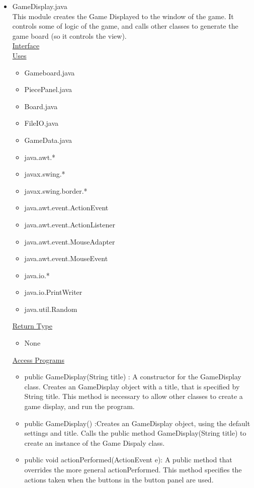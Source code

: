 \documentclass[12pt]{article}
\begin{document}
\begin{itemize}
		\item GameDisplay.java \\
		This module creates the Game Displayed to the window of the game. It controls some of logic of the game, and calls other classes to generate the game board (so it controls the view). \\
		\underline{Interface} \\
		\underline{Uses}
		\begin{itemize}
			\item Gameboard.java
			\item PiecePanel.java
			\item Board.java
			\item FileIO.java
			\item GameData.java
			\item java.awt.*
			\item javax.swing.*
			\item javax.swing.border.*
			\item java.awt.event.ActionEvent
			\item java.awt.event.ActionListener
			\item java.awt.event.MouseAdapter
			\item java.awt.event.MouseEvent
			\item java.io.*
			\item java.io.PrintWriter
			\item java.util.Random
		\end{itemize} 
		\underline{Return Type}
		\begin{itemize}
			\item None
		\end{itemize}
		\underline{Access Programs}
		\begin{itemize}
			\item public GameDisplay(String title) : A constructor for the GameDisplay class. Creates an GameDisplay object with a title, that is specified by String title. This method is necessary to allow other classes to create a game display, and run the program.
			\item public GameDisplay() :Creates an GameDisplay object, using the default settings and title. Calls the public method GameDisplay(String title) to create an instance of the Game Dispaly class.
			\item public void actionPerformed(ActionEvent e): A public method that overrides the more general actionPerformed. This method specifies the actions taken when the buttons in the button panel are used.

\end{itemize}
\end{itemize}
\end{document}
